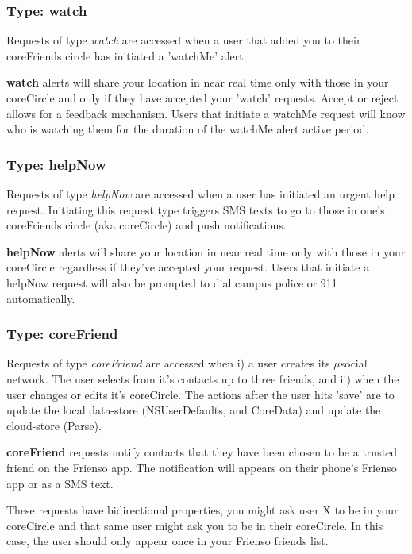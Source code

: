 \subsubsection{Type: watch}
  Requests of type \emph{watch} are accessed when a user that added you to their 
  coreFriends circle has initiated a 'watchMe' alert.
  
  \textbf{watch} alerts will share your location in near real time only with those
  in your coreCircle and only if they have accepted your 'watch' requests.  Accept or 
  reject allows for a feedback mechanism.  Users that initiate a watchMe request will
  know who is watching them for the duration of the watchMe alert active period.
  
\subsubsection{Type: helpNow}
  Requests of type \emph{helpNow} are accessed when a user has initiated an urgent help
  request.  Initiating this request type triggers SMS texts to go to those in
  one's coreFriends circle (aka coreCircle) and push notifications.
  
  \textbf{helpNow} alerts will share your location in near real time only with those
  in your coreCircle regardless if they've accepted your request.  Users that initiate 
  a helpNow request will also be prompted to dial campus police or 911 automatically.
   
\subsubsection{Type: coreFriend }
  Requests of type \emph{coreFriend} are accessed when i) a user creates its $\mu$social
  network.  The user selects from it's contacts up to three friends, and ii) when the user
  changes or edits it's coreCircle.  The actions after the user hits 'save' are to update
  the local data-store (NSUserDefaults, and CoreData) and update the cloud-store (Parse).
  
  \noindent \textbf{coreFriend} requests notify contacts that they have been chosen to be 
  a trusted friend on the Frienso app.  The notification will appears on their phone's 
  Frienso app or as a SMS text.  
  
  These requests have bidirectional properties, you might ask user X to be in your 
  coreCircle and that same user might ask you to be in their coreCircle.  In this case,
  the user should only appear once in your Frienso friends list.
  
